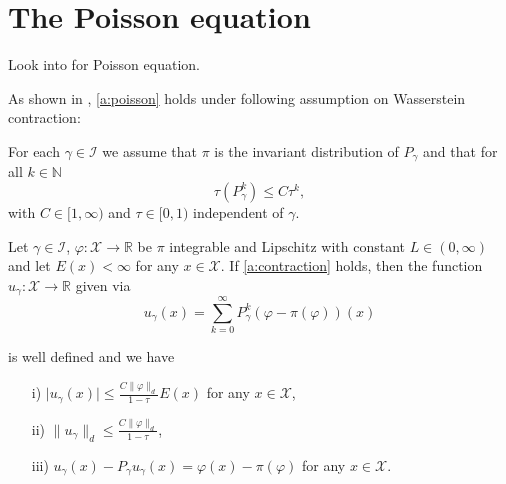 




\section{The Poisson equation}

Look into \cite{douc2018markov} for Poisson equation. 

As shown in \cite{hofstadler2024sureconvergenceratesadaptive}, \ref{a:poisson} holds under following assumption on Wasserstein contraction:

\begin{assumption}
\label{a:contraction}
For each $\gamma \in \mathcal{I}$ we assume that $\pi$ is the invariant distribution of $P_\gamma$ and that for all $k \in \mathbb{N}$ 
\[
\tau(P_\gamma^k) \leq C \tau^k,
\]
with $C \in [1, \infty)$ and $\tau \in [0,1)$  independent of $\gamma$.
\end{assumption} 


\begin{proposition}\label{prop:poisson_equation_wasserstein_setting}
Let $\gamma \in \mathcal{I}$, $ \varphi \colon \mathcal{X} \to \mathbb{R}$ be $\pi$ integrable and Lipschitz with constant $L \in (0, \infty)$ and let $E (x) < \infty$ for any $x \in \mathcal{X}$. 
If \ref{a:contraction} holds, then the function $u_\gamma\colon \mathcal{X} \to \mathbb{R}$ given via 
\begin{equation}
    \label{eq:poisson-neumann}
    u_\gamma(x) = \sum_{k=0}^\infty P_\gamma^k \left( \varphi - \pi(\varphi) \right)(x)
\end{equation}

is well defined and we have
\begin{itemize}
\item[i)] $\vert u_\gamma (x) \vert \leq \frac{C \| \varphi \|_{d}}{1- \tau} E(x)$ for any $x \in \mathcal{X}$,
\item[ii)] $\| u_\gamma \|_d \leq \frac{C \| \varphi \|_{d}}{1- \tau} $,
\item[iii)] $u_\gamma (x) - P_\gamma u_\gamma(x) = \varphi(x) - \pi(\varphi)$ for any $x \in \mathcal{X}$.
\end{itemize}

\end{proposition}


